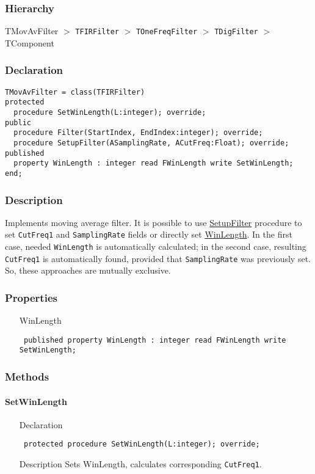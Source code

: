 \documentclass[12pt,a4paper,oneside]{report}
\newcommand{\declarationitem}[1]{{\addfontfeatures{FakeBold=1.3} #1}}
\newcommand{\descriptiontitle}[1]{{\addfontfeatures{FakeSlant}#1}}
\newcommand{\code}[1]{\texttt{#1}}
\begin{document}
\subsubsection{Hierarchy}
TMovAvFilter {$>$} \code{TFIRFilter} {$>$} \code{TOneFreqFilter} {$>$} \code{TDigFilter} {$>$} 
TComponent
\subsubsection{Declaration}
\begin{verbatim}
TMovAvFilter = class(TFIRFilter)
protected
  procedure SetWinLength(L:integer); override;
public
  procedure Filter(StartIndex, EndIndex:integer); override;
  procedure SetupFilter(ASamplingRate, ACutFreq:Float); override;
published
  property WinLength : integer read FWinLength write SetWinLength;
end;
\end{verbatim}
\subsubsection{Description}
Implements moving average filter. It is possible to use \hyperref[lmfilters.TMovAvFilter-SetupFilter]{SetupFilter} procedure to set \code{CutFreq1} and \code{SamplingRate} fields or directly set \hyperref[lmfilters.TFIRFilter-WinLength]{WinLength}. In the first case, needed \code{WinLength} is automatically calculated; in the second case, resulting \code{CutFreq1} is automatically found, provided that \code{SamplingRate} was previously set. So, these approaches are mutually exclusive. 
\subsubsection{Properties}
\begin{itemize}\label{lmfilters.TMovAvFilter-WinLength}
	\item[\declarationitem{WinLength}\hfill]
	\begin{flushleft}
		\code{
			published property WinLength : integer read FWinLength write SetWinLength;}
	\end{flushleft}
 \end{itemize}
\subsubsection{Methods}
\paragraph{SetWinLength}
\label{lmfilters.TMovAvFilter-SetWinLength}
\begin{itemize}\item[\declarationitem{Declaration}\hfill]
	\begin{flushleft}
		\code{
			protected procedure SetWinLength(L:integer); override;}
	\end{flushleft}
\item[\descriptiontitle{Description}] Sets WinLength, calculates corresponding \code{CutFreq1}.
\end{itemize}
\end{document}
